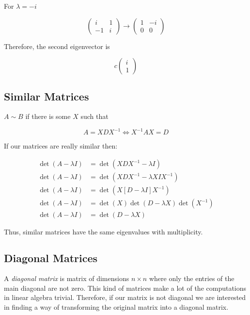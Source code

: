 For \(\lambda = -i\)

\[     
    \begin{pmatrix}
        i & 1 \\
        -1 & i
    \end{pmatrix}
    \rightarrow
    \begin{pmatrix}
        1 & -i \\
        0 & 0
    \end{pmatrix} 
\]

Therefore, the second eigenvector is 

\[  
    c
    \begin{pmatrix}
        i \\
        1        
    \end{pmatrix}
\]

\subsection{Similar Matrices}

\(A \sim B\) if there is some \(X\) such that 

\[
    A = XDX^{-1} \iff X^{-1}AX = D
\]

If our matrices are really similar then:

\begin{align*}
    \det(A - \lambda I) &= \det(XDX^{-1} - \lambda I)\\
    \det(A - \lambda I) &= \det(XDX^{-1} - \lambda X I X^{-1})\\
    \det(A - \lambda I) &= \det(X[D - \lambda I] X^{-1})\\
    \det(A - \lambda I) &= \det(X)\det(D - \lambda X) \det(X^{-1})\\
    \det(A - \lambda I) &= \det(D - \lambda X) 
\end{align*}

Thus, similar matrices have the same eigenvalues with multiplicity.

\subsection{Diagonal Matrices}

A \emph{diagonal matrix} is matrix of dimensions \(n \times n\) where only the entries of the main diagonal 
are not zero. This kind of matrices make a lot of the computations in linear algebra trivial. Therefore, 
if our matrix is not diagonal we are interested in finding a way of transforming the original matrix 
into a diagonal matrix.
\vspace{\baselineskip} 

